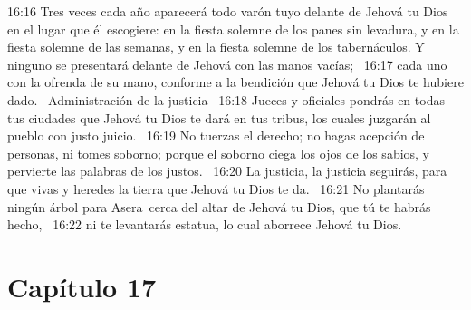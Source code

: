 16:16 Tres veces cada año aparecerá todo varón tuyo delante de Jehová tu Dios en el lugar que él escogiere: en la fiesta solemne de los panes sin levadura, y en la fiesta solemne de las semanas, y en la fiesta solemne de los tabernáculos. Y ninguno se presentará delante de Jehová con las manos vacías;  
16:17 cada uno con la ofrenda de su mano, conforme a la bendición que Jehová tu Dios te hubiere dado.  
Administración de la justicia  
16:18 Jueces y oficiales pondrás en todas tus ciudades que Jehová tu Dios te dará en tus tribus, los cuales juzgarán al pueblo con justo juicio.  
16:19 No tuerzas el derecho; no hagas acepción de personas, ni tomes soborno; porque el soborno ciega los ojos de los sabios, y pervierte las palabras de los justos.  
16:20 La justicia, la justicia seguirás, para que vivas y heredes la tierra que Jehová tu Dios te da.  
16:21 No plantarás ningún árbol para Asera cerca del altar de Jehová tu Dios, que tú te habrás hecho,  
16:22 ni te levantarás estatua, lo cual aborrece Jehová tu Dios.  
\section*{Capítulo 17 }

